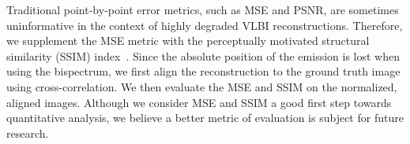 Traditional point-by-point error metrics, such as MSE and PSNR, are sometimes uninformative in the context of highly degraded VLBI reconstructions. 
Therefore, we supplement the MSE metric with the perceptually motivated structural similarity (SSIM) index~\cite{wang2003ssim}.
Since the absolute position of the emission is lost when using the bispectrum, we first align the reconstruction to the ground truth image using cross-correlation. We then evaluate the MSE and SSIM on the normalized, aligned images. 
	Although we consider MSE and SSIM a good first step towards quantitative analysis, we believe a better metric of evaluation is subject for future research. 






